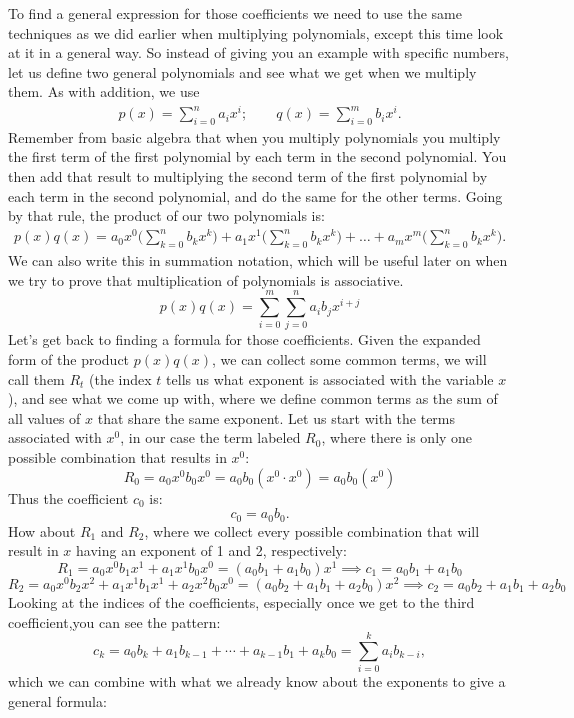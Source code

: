 To find a general expression for those coefficients we need to use the same techniques as we did earlier when multiplying polynomials, except this time look at it in a general way.  So instead of giving you an example with specific numbers, let us define two general polynomials and see what we get when we multiply them. As with addition, we use
\begin{align*}
p(x)  = \sum^{n}_{i=0} a_i x^i; \qquad
q(x)  = \sum^{m}_{i=0} b_i x^i.
\end{align*}	
Remember from basic algebra that when you multiply polynomials you multiply the first term of the first polynomial by each term in the second polynomial.  You then add that result to multiplying the second term of the first polynomial by each term in the second polynomial, and do the same for the other terms.  Going by that rule, the product of our two polynomials is:
\begin{align*}
p(x)q(x)= a_0x^0 \Big( \sum_{k=0}^n b_k x^k\Big) + a_1x^1 \Big(\sum_{k=0}^n b_k x^k \Big) + \ldots + a_mx^m \Big( \sum_{k=0}^n b_k x^k\Big). 
\end{align*}
We can also write this in summation notation, which will be useful later on when we try to prove that multiplication of polynomials is associative.
\[
p(x) q(x) =\sum_{i=0}^{m}\sum_{j=0}^{n}a_i b_j x^{i+j}
\]
Let's get back to finding a formula for those coefficients.  Given the expanded form of the product $p(x)q(x)$, we can collect some common terms, we will call them $R_t$ (the index $t$ tells us what exponent is associated with the variable $x$), and see what we come up with, where we define common terms as the sum of all values of $x$ that share the same exponent.  Let us start with the terms associated with $x^0$, in our case the term labeled $R_0$, where there is only one possible combination that results in $x^0$:
\[ R_0=a_0x^0b_0x^0 = a_0b_0(x^0\cdot x^0)=a_0b_0(x^0) \]
Thus the coefficient $c_0$ is:
\[ c_0= a_0b_0. \]
How about $R_1$ and $R_2$, where we collect every possible combination that will result in $x$ having an exponent of 1 and 2, respectively:
\[ R_1= a_0x^0b_1x^1 + a_1x^1b_0x^0 = (a_0b_1+a_1b_0)x^1  \implies c_1= a_0b_1+a_1b_0 \]
\[R_2= a_0x^0b_2x^2 + a_1x^1b_1x^1 + a_2x^2b_0x^0 = (a_0b_2 + a_1b_1 +a_2b_0)x^2 \implies c_2 = a_0b_2 + a_1b_1 +a_2b_0 \]
Looking at the indices of the coefficients, especially once we get to the third coefficient,you can see the pattern:  
\[
c_k  = a_0  b_k + a_1 b_{k -1} + \cdots + a_{k -1} b _1 + a_k b_0 = \sum_{i = 0}^k a_i b_{k - i},
\]
which we can combine with what we already know about the exponents to give a general formula:

